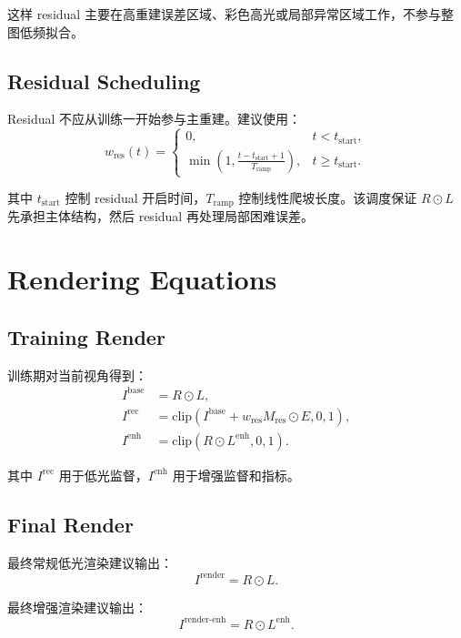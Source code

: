 \documentclass[11pt]{article}
\begin{document}
这样 residual 主要在高重建误差区域、彩色高光或局部异常区域工作，不参与整图低频拟合。

\subsection{Residual Scheduling}

Residual 不应从训练一开始参与主重建。建议使用：
\begin{equation}
    w_{\text{res}}(t)
    =
    \begin{cases}
        0, & t < t_{\text{start}}, \\
        \min\left(1, \frac{t - t_{\text{start}} + 1}{T_{\text{ramp}}}\right), & t \ge t_{\text{start}}.
    \end{cases}
\end{equation}

其中 $t_{\text{start}}$ 控制 residual 开启时间，$T_{\text{ramp}}$ 控制线性爬坡长度。该调度保证 $R \odot L$ 先承担主体结构，然后 residual 再处理局部困难误差。

\section{Rendering Equations}

\subsection{Training Render}

训练期对当前视角得到：
\begin{align}
    I^{\text{base}} &= R \odot L, \\
    I^{\text{rec}}  &= \mathrm{clip}\left(I^{\text{base}} + w_{\text{res}} M_{\text{res}} \odot E, 0, 1\right), \\
    I^{\text{enh}}  &= \mathrm{clip}\left(R \odot L^{\text{enh}}, 0, 1\right).
\end{align}

其中 $I^{\text{rec}}$ 用于低光监督，$I^{\text{enh}}$ 用于增强监督和指标。

\subsection{Final Render}

最终常规低光渲染建议输出：
\begin{equation}
    I^{\text{render}} = R \odot L.
\end{equation}

最终增强渲染建议输出：
\begin{equation}
    I^{\text{render-enh}} = R \odot L^{\text{enh}}.
\end{equation}
\end{document}
